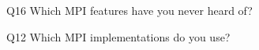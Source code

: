 \begin{description}%
\item{Q16} Which MPI features have you never heard of?%
\item{Q12} Which MPI implementations do you use?%
\end{description}%
